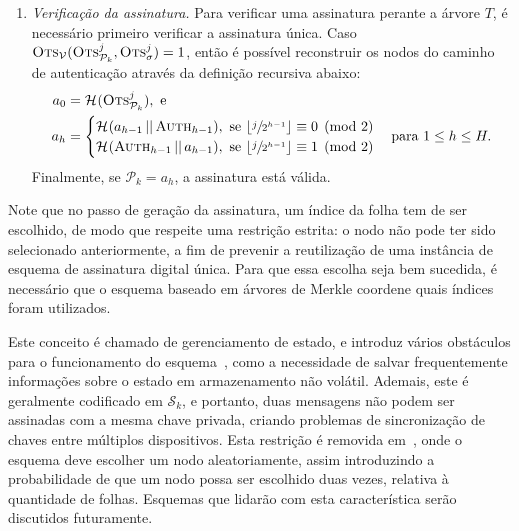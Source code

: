 \documentclass[12pt,notitlepage]{report}
\newcommand{\pk}{\mathcal{P}_k}
\newcommand{\sk}{\mathcal{S}_k}
\newcommand{\hash}[2][]{\mathcal{H}^{#1}(#2)}
\newcommand{\concat}{\, \vert \vert \,}
\begin{document}
\begin{enumerate}
  \item[] \emph{Verificação da assinatura.} Para verificar uma assinatura
      perante a árvore $T$, é necessário primeiro verificar a assinatura única.
        Caso $\textsc{Ots}_{\mathcal{V}}(\textsc{Ots}_{\pk{}}^{j},
        \textsc{Ots}_{\sigma}^{j}) = 1$, então é possível reconstruir os nodos
        do caminho de autenticação através da definição recursiva abaixo:
        \begin{equation}
          \begin{split}
            a_{0} &= \hash{\textsc{Ots}_{\pk{}}^{j}}, \text{ e } \\
            a_{h} &=
            \begin{cases}
              \hash{a_{h - 1} \concat \textsc{Auth}_{h - 1}}, \text{ se }
                \lfloor \sfrac{j}{2^{h - 1}} \rfloor \equiv 0 \pmod{2} \\
              \hash{\textsc{Auth}_{h - 1} \concat a_{h - 1}}, \text{ se }
                \lfloor \sfrac{j}{2^{h - 1}} \rfloor \equiv 1 \pmod{2} \\
            \end{cases} \text{para } 1 \leq h \leq H.
          \end{split}
        \end{equation}
        Finalmente, se $\pk{} = a_{h}$, a assinatura está válida.

\end{enumerate}

Note que no passo de geração da assinatura, um índice da folha tem de ser escolhido, de modo que respeite uma restrição estrita: o nodo não pode ter sido selecionado anteriormente, a fim de prevenir a reutilização de uma instância de esquema de assinatura digital única. Para que essa escolha seja bem sucedida, é necessário que o esquema baseado em árvores de Merkle coordene quais índices foram utilizados.

Este conceito é chamado de gerenciamento de estado, e introduz vários obstáculos para o funcionamento do esquema~\cite{McGrew2016}, como a necessidade de salvar frequentemente informações sobre o estado em armazenamento não volátil. Ademais, este é geralmente codificado em $\sk{}$, e portanto, duas mensagens não podem ser assinadas com a mesma chave privada, criando problemas de sincronização de chaves entre múltiplos dispositivos. Esta restrição é removida em~\cite[6.4.16]{Goldreich:2004:FCV:975541}, onde o esquema deve escolher um nodo aleatoriamente, assim introduzindo a probabilidade de que um nodo possa ser escolhido duas vezes, relativa à quantidade de folhas. Esquemas que lidarão com esta característica serão discutidos futuramente.
\end{document}
